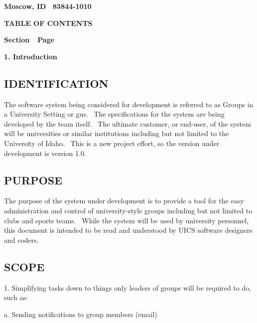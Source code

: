 \documentclass[letterpaper]{article}
\newcommand\textstyleDefaultParagraphFont[1]{#1}
\begin{document}
{\centering\bfseries\color{black}
Moscow, ID \ 83844-1010
\par}


{\centering\bfseries\color{black}
TABLE OF CONTENTS
\par}


\bigskip

{\bfseries\color{black}
Section\ \ Page}

\setcounter{tocdepth}{9}
\renewcommand\contentsname{Table of Contents}
\tableofcontents
\clearpage\clearpage\setcounter{page}{1}\pagestyle{MPii}
{\centering\bfseries\color{black}
\textstyleDefaultParagraphFont{1. Introduction}
\par}

\subsection[IDENTIFICATION]{\rmfamily IDENTIFICATION}
{\color{black}
The software system being considered for development is referred to as
Groups in a University Setting or gus. \ The specifications for the
system are being developed by the team itself. \ The ultimate customer,
or end-user, of the system will be universities or similar institutions
including but not limited to the University of Idaho. \ This is a new
project effort, so the version under development is version 1.0.}

\subsection[PURPOSE]{\rmfamily PURPOSE}
{\color{black}
The purpose of the system under development is to provide a tool for the
easy administration and control of university-style groups including
but not limited to clubs and sports teams. \ While the system will be
used by university personnel, this document is intended to be read and
understood by UICS software designers and coders.}

\subsection[SCOPE]{\rmfamily SCOPE}
{\color{black}
\textstyleDefaultParagraphFont{1. Simplifying tasks down to things only
leaders of groups will be required to do, such as:}}

{\color{black}
\textstyleDefaultParagraphFont{a. Sending notifications to group members
(email)}}
\end{document}
